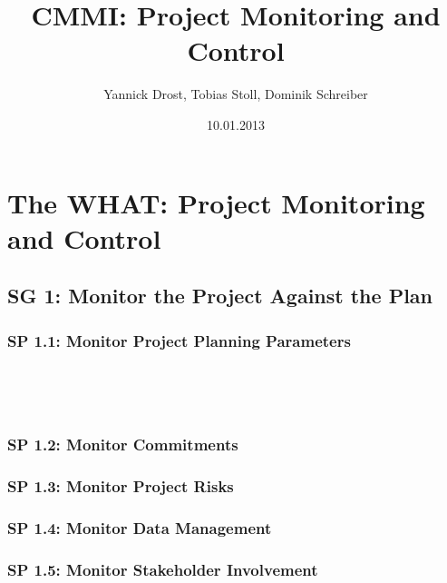 \documentclass[accentcolor=tud10d]{tudbeamer}
\title{CMMI: Project Monitoring and Control}
\author{Yannick Drost, Tobias Stoll, Dominik Schreiber}
\date{10.01.2013}
\newcommand{\strong}[1]{\textaccentcolor{\textsf{\textbf{#1}}}}
\newenvironment{tframe}{
	\begin{frame}
	\frametitle{\ifnum\Level=3\insertsectionhead\\\strong{\insertsubsectionhead}\fi\ifnum\Level=4\insertsubsectionhead\\\strong{\insertsubsubsectionhead}\fi
	}
}{
	\end{frame}
}
\begin{document}
\begin{titleframe}
\end{titleframe}

\section{The WHAT: Project Monitoring and Control}
\begin{frame}

\cite{cmmi2010cmmidevelopment13}

\end{frame}


\subsection{SG 1: Monitor the Project Against the Plan}

\subsubsection{SP 1.1: Monitor Project Planning Parameters}
\begin{tframe}

\end{tframe}

\subsubsection{SP 1.2: Monitor Commitments}

\subsubsection{SP 1.3: Monitor Project Risks}

\subsubsection{SP 1.4: Monitor Data Management}

\subsubsection{SP 1.5: Monitor Stakeholder Involvement}
\end{document}
